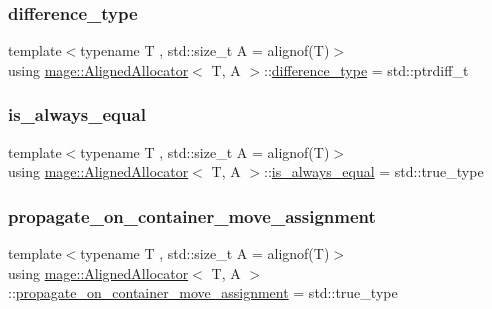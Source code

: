 \subsubsection{\texorpdfstring{difference\+\_\+type}{difference\_type}}
{\footnotesize\ttfamily template$<$typename T , std\+::size\+\_\+t A = alignof(\+T)$>$ \\
using \mbox{\hyperlink{classmage_1_1_aligned_allocator}{mage\+::\+Aligned\+Allocator}}$<$ T, A $>$\+::\mbox{\hyperlink{classmage_1_1_aligned_allocator_a02c62745f0f0414eea74f3393b1710f7}{difference\+\_\+type}} =  std\+::ptrdiff\+\_\+t}

\mbox{\label{classmage_1_1_aligned_allocator_a144fbbf7d538636d83b3eb45965af6bf}} 
\subsubsection{\texorpdfstring{is\+\_\+always\+\_\+equal}{is\_always\_equal}}
{\footnotesize\ttfamily template$<$typename T , std\+::size\+\_\+t A = alignof(\+T)$>$ \\
using \mbox{\hyperlink{classmage_1_1_aligned_allocator}{mage\+::\+Aligned\+Allocator}}$<$ T, A $>$\+::\mbox{\hyperlink{classmage_1_1_aligned_allocator_a144fbbf7d538636d83b3eb45965af6bf}{is\+\_\+always\+\_\+equal}} =  std\+::true\+\_\+type}

\mbox{\label{classmage_1_1_aligned_allocator_a810022ca5c53154ee0903a8f236b3395}} 
\subsubsection{\texorpdfstring{propagate\+\_\+on\+\_\+container\+\_\+move\+\_\+assignment}{propagate\_on\_container\_move\_assignment}}
{\footnotesize\ttfamily template$<$typename T , std\+::size\+\_\+t A = alignof(\+T)$>$ \\
using \mbox{\hyperlink{classmage_1_1_aligned_allocator}{mage\+::\+Aligned\+Allocator}}$<$ T, A $>$\+::\mbox{\hyperlink{classmage_1_1_aligned_allocator_a810022ca5c53154ee0903a8f236b3395}{propagate\+\_\+on\+\_\+container\+\_\+move\+\_\+assignment}} =  std\+::true\+\_\+type}

